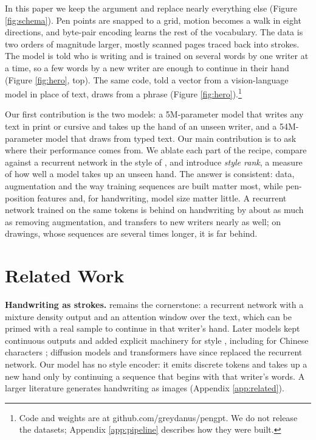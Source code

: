 \documentclass{article}
\begin{document}
In this paper we keep the argument and replace nearly everything else (Figure \ref{fig:schema}). Pen points are snapped to a grid, motion becomes a walk in eight directions, and byte-pair encoding \citep{sennrich2016neural} learns the rest of the vocabulary. The data is two orders of magnitude larger, mostly scanned pages traced back into strokes. The model is told who is writing and is trained on several words by one writer at a time, so a few words by a new writer are enough to continue in their hand (Figure \ref{fig:hero}, top). The same code, told a vector from a vision-language model in place of text, draws from a phrase (Figure \ref{fig:hero}).\footnote{Code and weights are at github.com/greydanus/pengpt. We do not release the datasets; Appendix \ref{app:pipeline} describes how they were built.}

Our first contribution is the two models: a 5M-parameter model that writes any text in print or cursive and takes up the hand of an unseen writer, and a 54M-parameter model that draws from typed text. Our main contribution is to ask where their performance comes from. We ablate each part of the recipe, compare against a recurrent network in the style of \citet{graves2014generating}, and introduce \emph{style rank}, a measure of how well a model takes up an unseen hand. The answer is consistent: data, augmentation and the way training sequences are built matter most, while pen-position features and, for handwriting, model size matter little. A recurrent network trained on the same tokens is behind on handwriting by about as much as removing augmentation, and transfers to new writers nearly as well; on drawings, whose sequences are several times longer, it is far behind.

\section{Related Work}

\textbf{Handwriting as strokes.} \citet{graves2014generating} remains the cornerstone: a recurrent network with a mixture density output and an attention window over the text, which can be primed with a real sample to continue in that writer's hand. Later models kept continuous outputs and added explicit machinery for style \citep{aksan2018deepwriting,kotani2020generating,dai2023disentangling,timofeev2023dss}, including for Chinese characters \citep{zhang2018drawing,tang2019fontrnn,tang2021write}; diffusion models \citep{luhman2020diffusion,pan2026diffink} and transformers \citep{jin2025trink} have since replaced the recurrent network. Our model has no style encoder: it emits discrete tokens and takes up a new hand only by continuing a sequence that begins with that writer's words. A larger literature generates handwriting as images (Appendix \ref{app:related}).
\end{document}
